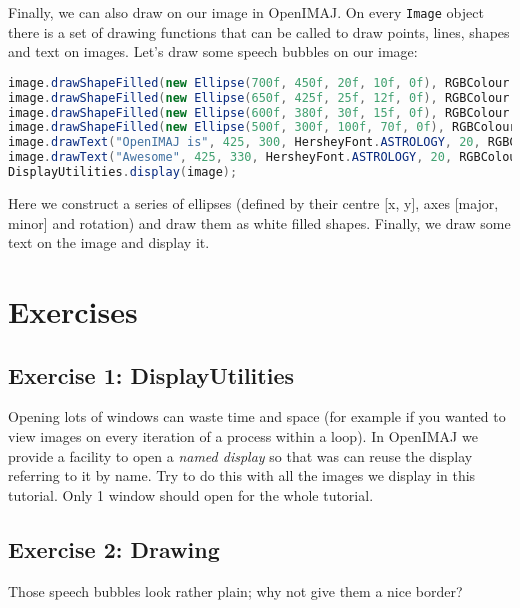 Finally, we can also draw on our image in OpenIMAJ. On every \verb+Image+ object there is a 
set of drawing functions that can be called to draw points, lines, shapes and text on 
images. Let's draw some speech bubbles on our image:
\begin{lstlisting}[language=java]
image.drawShapeFilled(new Ellipse(700f, 450f, 20f, 10f, 0f), RGBColour.WHITE);
image.drawShapeFilled(new Ellipse(650f, 425f, 25f, 12f, 0f), RGBColour.WHITE);
image.drawShapeFilled(new Ellipse(600f, 380f, 30f, 15f, 0f), RGBColour.WHITE);
image.drawShapeFilled(new Ellipse(500f, 300f, 100f, 70f, 0f), RGBColour.WHITE);
image.drawText("OpenIMAJ is", 425, 300, HersheyFont.ASTROLOGY, 20, RGBColour.BLACK);
image.drawText("Awesome", 425, 330, HersheyFont.ASTROLOGY, 20, RGBColour.BLACK);
DisplayUtilities.display(image);
\end{lstlisting}
Here we construct a series of ellipses (defined by their centre [x, y], axes 
[major, minor] and rotation) and draw them as white filled shapes. Finally, we draw 
some text on the image and display it.

\section*{Exercises}
\subsection*{Exercise 1: DisplayUtilities}
Opening lots of windows can waste time and space (for example if you wanted to view images on every 
iteration of a process within a loop). In OpenIMAJ we provide a facility to open a 
\emph{named display} so that was can reuse the display referring to it by name. Try to do this with all the 
images we display in this tutorial. Only 1 window should open for the whole tutorial.
\subsection*{Exercise 2: Drawing}
Those speech bubbles look rather plain; why not give them a nice border?
